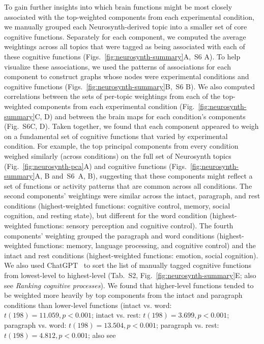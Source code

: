\documentclass[english, 11pt]{article}
\newcommand{\neurosynthFull}{S6}
\newcommand{\topicTags}{S2}
\begin{document}
To gain further insights into which brain functions might be most closely
associated with the top-weighted components from each experimental condition,
we manually grouped each Neurosynth-derived topic into a smaller set of core
cognitive functions. Separately for each component, we computed the average
weightings across all topics that were tagged as being associated with each of
these cognitive functions (Figs.~\ref{fig:neurosynth-summary}A,~\neurosynthFull
A). To help visualize these associations, we used the patterns of associations
for each component to construct graphs whose nodes were experimental conditions
and cognitive functions (Figs.~\ref{fig:neurosynth-summary}B,~\neurosynthFull
B). We also computed correlations between the sets of per-topic weightings from
each of the top-weighted components from each experimental condition
(Fig.~\ref{fig:neurosynth-summary}C, D) and between the brain maps for each
condition's components (Fig.~\neurosynthFull C, D). Taken together, we found
that each component appeared to weigh on a fundamental set of cognitive
functions that varied by experimental condition. For example, the top principal
components from every condition weighed similarly (across conditions) on the
full set of Neurosynth topics (Fig.~\ref{fig:neurosynth-pca}A) and cognitive
functions (Figs.~\ref{fig:neurosynth-summary}A, B and~\neurosynthFull~A, B),
suggesting that these components might reflect a set of functions or activity
patterns that are common across all conditions. The second components'
weightings were similar across the intact, paragraph, and rest conditions
(highest-weighted functions: cognitive control, memory, social cognition, and
resting state), but different for the word condition (highest-weighted
functions: sensory perception and cognitive control). The fourth components'
weighting grouped the paragraph and word conditions (highest-weighted
functions: memory, language processing, and cognitive control) and the intact
and rest conditions (highest-weighted functions: emotion, social cognition). We
also used ChatGPT~\citep{ChatGPT} to sort the list of manually tagged cognitive
functions from lowest-level to highest-level (Tab.~\topicTags,
Fig.~\ref{fig:neurosynth-summary}E; also see \textit{Ranking cognitive
processes}). We found that higher-level functions tended to be weighted more
heavily by top components from the intact and paragraph conditions than
lower-level functions (intact vs. word: $t(198) = 11.059, p < 0.001$; intact
vs. rest: $t(198) = 3.699, p < 0.001$; paragraph vs. word: $t(198) = 13.504, p
< 0.001$; paragraph vs. rest: $t(198) = 4.812, p < 0.001$; also see
\end{document}
